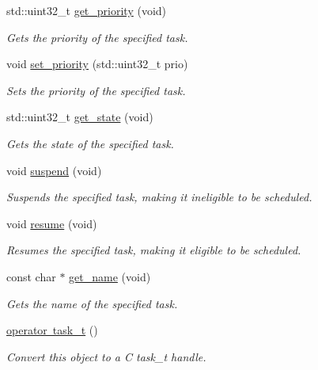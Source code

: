 \begin{DoxyCompactItemize}
std\+::uint32\+\_\+t \mbox{\hyperlink{classpros_1_1Task_a97e11478bd99181a664ed6e975fdb248}{get\+\_\+priority}} (void)
\begin{DoxyCompactList}\small\item\em Gets the priority of the specified task. \end{DoxyCompactList}\item 
void \mbox{\hyperlink{classpros_1_1Task_a205a9937d34311ba10f540bc58d0b0b9}{set\+\_\+priority}} (std\+::uint32\+\_\+t prio)
\begin{DoxyCompactList}\small\item\em Sets the priority of the specified task. \end{DoxyCompactList}\item 
std\+::uint32\+\_\+t \mbox{\hyperlink{classpros_1_1Task_a45f0b63eec57e7fe8adf3876988588bf}{get\+\_\+state}} (void)
\begin{DoxyCompactList}\small\item\em Gets the state of the specified task. \end{DoxyCompactList}\item 
void \mbox{\hyperlink{classpros_1_1Task_a89005762dcd3026c953ae5eedd7ecd97}{suspend}} (void)
\begin{DoxyCompactList}\small\item\em Suspends the specified task, making it ineligible to be scheduled. \end{DoxyCompactList}\item 
void \mbox{\hyperlink{classpros_1_1Task_ada2c08d04b39f11582cea90b59b8f317}{resume}} (void)
\begin{DoxyCompactList}\small\item\em Resumes the specified task, making it eligible to be scheduled. \end{DoxyCompactList}\item 
const char $\ast$ \mbox{\hyperlink{classpros_1_1Task_a3c559d11cf602b99fc870b8be43fe191}{get\+\_\+name}} (void)
\begin{DoxyCompactList}\small\item\em Gets the name of the specified task. \end{DoxyCompactList}\item 
\mbox{\hyperlink{classpros_1_1Task_a16c15efcec74a76b6848fc999ff0c232}{operator task\+\_\+t}} ()
\begin{DoxyCompactList}\small\item\em Convert this object to a C task\+\_\+t handle. \end{DoxyCompactList}\item 

\end{DoxyCompactItemize}
